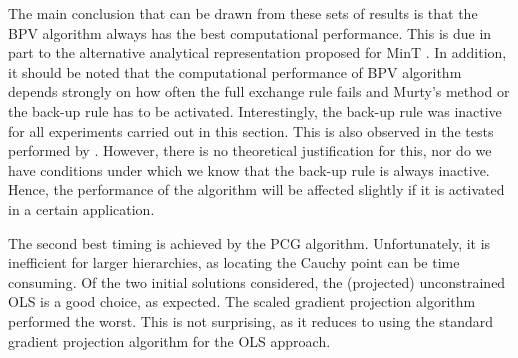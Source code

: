 \documentclass[11pt]{article}
\newcommand{\0}{\phantom{0}}
\begin{document}
The main conclusion that can be drawn from these sets of results is that the BPV algorithm always has the best computational performance. This is due in part to the alternative analytical representation proposed for MinT \citep{Wick2018}. In addition, it should be noted that the computational performance of BPV algorithm depends strongly on how often the full exchange rule fails and Murty's method or the back-up rule has to be activated. Interestingly, the back-up rule was inactive for all experiments carried out in this section. This is also observed in the tests performed by \citet{Kim2011}. However, there is no theoretical justification for this, nor do we have conditions under which we know that the back-up rule is always inactive. Hence, the performance of the algorithm will be affected slightly if it is activated in a certain application.

The second best timing is achieved by the PCG algorithm. Unfortunately, it is inefficient for larger hierarchies, as locating the Cauchy point can be time consuming. Of the two initial solutions considered, the (projected) unconstrained OLS is a good choice, as expected. The scaled gradient projection algorithm performed the worst. This is not surprising, as it reduces to using the standard gradient projection algorithm for the OLS approach.  
\end{document}
